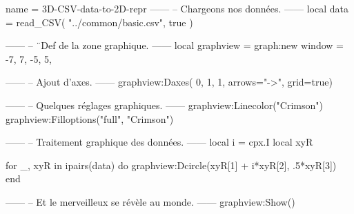 \documentclass{standalone}
\begin{document}
\begin{luadraw}{name = 3D-CSV-data-to-2D-repr}
------
-- Chargeons nos données.
------
local data = read_CSV(
  "../common/basic.csv",
  true
)

------
-- ¨Def de la zone graphique.
------
local graphview = graph:new{
  window = {-7, 7, -5, 5},
}

------
-- Ajout d'axes.
------
graphview:Daxes(
  {0, 1, 1},
  {arrows="->",
  grid=true})

------
-- Quelques réglages graphiques.
------
graphview:Linecolor("Crimson")
graphview:Filloptions("full", "Crimson")

------
-- Traitement graphique des données.
------
local i = cpx.I
local xyR

for _, xyR in ipairs(data) do
  graphview:Dcircle(xyR[1] + i*xyR[2], .5*xyR[3])
end

------
-- Et le merveilleux se révèle au monde.
------
graphview:Show()
\end{luadraw}
\end{document}
